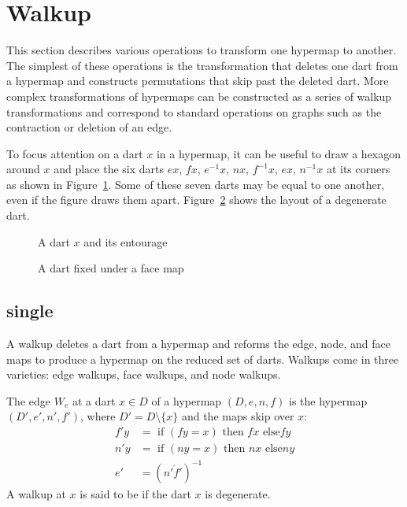 \section{Walkup}

This section describes various operations to transform one hypermap to
another.  The simplest of these operations is the 
transformation that deletes one dart from a hypermap and constructs
permutations that skip past the deleted dart.  More complex
transformations of hypermaps can be constructed as a series of walkup
transformations and correspond to standard operations on graphs such as the
contraction or deletion of an edge.

To focus attention on a dart $x$ in a hypermap, it can be useful to draw a
hexagon around $x$ and place the six darts $e x$, $f x$, $e^{-1} x$,
$n x$, $f^{-1} x$, $e x$, $n^{-1} x$ at its corners as shown in
Figure~\ref{fig:dart+}.  Some of these seven darts may be equal to one
another, even if the figure draws them apart.
Figure~\ref{fig:dart-fix} shows the layout of a degenerate dart.
%

\begin{figure}[htb]
\centering
{}
\caption{A dart $x$ and its entourage}
\label{fig:dart+}
\end{figure}

\begin{figure}[htb]
\centering
{}
\caption{A dart fixed under a face map}
\label{fig:dart-fix}
\end{figure}

\subsection{single}

A walkup deletes a dart from a hypermap and reforms the edge, node,
and face maps to produce a hypermap on the reduced set of darts.
Walkups come in three varieties: edge walkups, face walkups, and node
walkups.

\begin{definition}
The edge 
$W_e$ at  a dart $x\in D$ of a hypermap $(D,e,n,f)$ is the hypermap
$(D',e',n',f')$, where $D' = D\setminus\{x\}$ and the maps skip over $x$:
\begin{align*}
f' y &= \text{ if } (f y =  x) \text{ then } f x \text{ else
} f y\\
n' y &= \text{ if } (n y = x) \text{ then } n x \text{ else
} n y\\
e' &= (n'\ocirc f')^{-1}
\end{align*}
A walkup at $x$ is said to be  if the dart $x$ is
degenerate.  
%
%
%
%
%
\end{definition}

